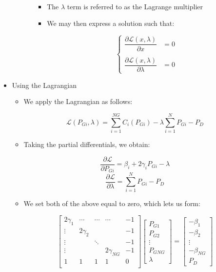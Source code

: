 \begin{itemize}
\begin{itemize}
\begin{itemize}
            \begin{itemize}

              \item The $\lambda$ term is referred to as the Lagrange multiplier

              \item We may then express a solution such that:

                $$\left\{\begin{array}{ll} \dfrac{\partial\mathcal{L}(x,\lambda)}{\partial x}&=0\\\\\dfrac{\partial \mathcal{L}(x,\lambda)}{\partial\lambda}&= 0\end{array}$$

            \end{itemize}

        \end{itemize}

    \end{itemize}
    
  \item Using the Lagrangian

    \begin{itemize}

      \item We apply the Lagrangian as follows:

        $$\mathcal{L}(P_{Gi},\lambda)=\sum_{i=1}^{NG}C_i(P_{Gi})-\lambda\sum_{i=1}^{N}P_{Gi}-P_{D}$$

      \item Taking the partial differentials, we obtain:

        $$\frac{\partial\mathcal{L}}{\partial P_{Gi}}=\beta_i+2\gamma_iP_{Gi}-\lambda$$
        $$\frac{\partial\mathcal{L}}{\partial \lambda}=\sum_{i=1}^N P_{Gi}-P_D$$

      \item We set both of the above equal to zero, which lets us form:

        $$\left[ \begin{matrix} 2\gamma_1 & \cdots & \cdots &  \cdots & -1\\ \vdots & 2\gamma_2 & & & -1\\ \vdots & & \ddots & & -1\\ \vdots & & & 2\gamma_{NG} & -1\\ 1 & 1 & 1 & 1 & 0\\\end{matrix} \right]\left[ \begin{matrix} P_{G1}\\P_{G2}\\\vdots\\ P_{GNG}\\ \lambda\end{matrix} \right]=\left[ \begin{matrix} -\beta_1\\ -\beta_{2}\\ \vdots\\ -\beta_{NG}\\ P_D\end{matrix} \right]$$


\end{itemize}
\end{itemize}
